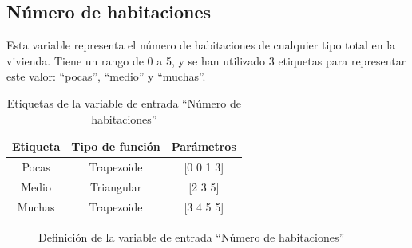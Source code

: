 \documentclass[12pt]{report} %
\begin{document}
        \subsection{Número de habitaciones}
        Esta variable representa el número de habitaciones de cualquier tipo total en la vivienda.
        Tiene un rango de 0 a 5, y se han utilizado 3 etiquetas para representar este valor: ``pocas'', ``medio'' y ``muchas''.

        \begin{table}[h]
            \center
            \begin{tabular}{@{}ccc@{}}
                \toprule
                \textbf{Etiqueta} & \textbf{Tipo de función} & \textbf{Parámetros} \\
                \midrule
                Pocas  & Trapezoide & [0 0 1 3] \\
                Medio  & Triangular & [2 3 5]   \\
                Muchas & Trapezoide & [3 4 5 5] \\
                \bottomrule
            \end{tabular}
            \caption{Etiquetas de la variable de entrada ``Número de habitaciones''}
        \end{table}

        \begin{figure}[H]
            \centering
            \caption{Definición de la variable de entrada ``Número de habitaciones''}
        \end{figure}
\end{document}
